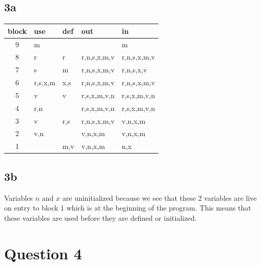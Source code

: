 \documentclass{article}
\begin{document}
    \subsection*{3a}
    \begin{center}
        \begin{tabular}{ | c | l | l | l | l | }
            \hline
            block   & use       & def   & out           & in            \\
            \hline
            9       & m         &       &               & m             \\
            \hline
            8       & r         & r     & r,n,s,x,m,v   & r,n,s,x,m,v   \\
            \hline
            7       & s         & m     & r,n,s,x,m,v   & r,n,s,x,v         \\
            \hline
            6       & r,s,x,m   & x,s   & r,n,s,x,m,v   & r,n,s,x,m,v       \\
            \hline
            5       & v         & v     & r,s,x,m,v,n   & r,s,x,m,v,n   \\
            \hline
            4       & r,n       &       & r,s,x,m,v,n   & r,s,x,m,v,n   \\
            \hline
            3       & v         & r,s   & r,n,s,x,m,v   & v,n,x,m           \\
            \hline
            2       & v,n       &       & v,n,x,m       & v,n,x,m         \\
            \hline
            1       &           & m,v   & v,n,x,m       & n,x             \\
            \hline
        \end{tabular}
    \end{center}

    \subsection*{3b}
    Variables $n$ and $x$ are uninitialized because we see that these 2 variables are live on entry to block 1 which is at the beginning of the program. This means that these variables are used before they are defined or initialized.

    \section*{Question 4}
\end{document}
